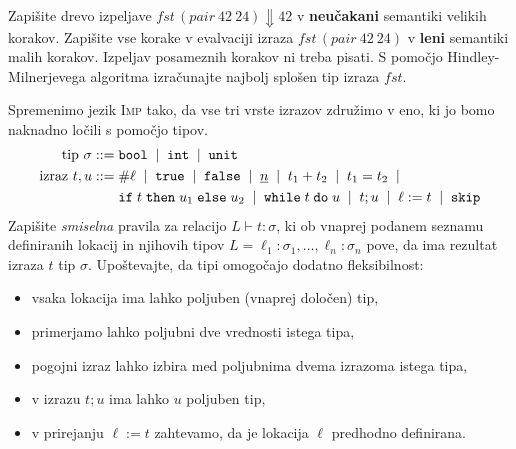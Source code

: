 \documentclass[arhiv]{../izpit}
\begin{document}
\podnaloga[\tocke{5}] Zapišite drevo izpeljave $\mathit{fst} \, (\mathit{pair} \ 42 \ 24) \Downarrow 42$ v \textbf{neučakani} semantiki velikih korakov.
\podnaloga[\tocke{5}] Zapišite vse korake v evalvaciji izraza $\mathit{fst} \, (\mathit{pair} \ 42 \ 24)$ v \textbf{leni} semantiki malih korakov. Izpeljav posameznih korakov ni treba pisati.
\podnaloga[\tocke{10}] S pomočjo Hindley-Milnerjevega algoritma izračunajte najbolj splošen tip izraza $\mathit{fst}$.

\nadaljevanje


\naloga[\tocke{20}]

Spremenimo jezik \textsc{Imp} tako, da vse tri vrste izrazov združimo v eno, ki jo bomo naknadno ločili s pomočjo tipov.
\begin{align*}
  \text{tip $\sigma$} \mathrel{{:}{:}{=}} {}
   & \mathtt{bool} \;\mid\;
  \mathtt{int} \;\mid\;
  \mathtt{unit}                       \\
  \text{izraz $t, u$} \mathrel{{:}{:}{=}} {}
   & \# \ell \;\mid\;
  \mathtt{true} \;\mid\;
  \mathtt{false} \;\mid\;
  \underline{n} \;\mid\;
  t_1 + t_2 \;\mid\;
  t_1 = t_2 \;\mid\;                    \\
   & \mathtt{if}\;t\;\mathtt{then}\;u_1\;\mathtt{else}\;u_2 \;\mid\;
  \mathtt{while}\;t\;\mathtt{do}\;u \;\mid\;
  t ; u \;\mid\;
  \ell := t \;\mid\;
  \mathtt{skip}
\end{align*}
Zapišite \emph{smiselna} pravila za relacijo $L \vdash t : \sigma$, ki ob vnaprej podanem seznamu definiranih lokacij in njihovih tipov $L = \ell_1 : \sigma_1, \dots, \ell_n : \sigma_n$ pove, da ima rezultat izraza $t$ tip $\sigma$. Upoštevajte, da tipi omogočajo dodatno fleksibilnost:
\begin{itemize}
  \item vsaka lokacija ima lahko poljuben (vnaprej določen) tip,
  \item primerjamo lahko poljubni dve vrednosti istega tipa,
  \item pogojni izraz lahko izbira med poljubnima dvema izrazoma istega tipa,
  \item v izrazu $t; u$ ima lahko $u$ poljuben tip,
  \item v prirejanju $\ell := t$ zahtevamo, da je lokacija $\ell$ predhodno definirana.
\end{itemize}


\nadaljevanje

\end{document}
